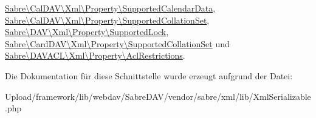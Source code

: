 \mbox{\hyperlink{class_sabre_1_1_cal_d_a_v_1_1_xml_1_1_property_1_1_supported_calendar_data_a4458e6241019a0b31e1c81b76cf5d740}{Sabre\textbackslash{}\+Cal\+D\+A\+V\textbackslash{}\+Xml\textbackslash{}\+Property\textbackslash{}\+Supported\+Calendar\+Data}}, \mbox{\hyperlink{class_sabre_1_1_cal_d_a_v_1_1_xml_1_1_property_1_1_supported_collation_set_ab5e9f7048ec0723afe382543bdd9282e}{Sabre\textbackslash{}\+Cal\+D\+A\+V\textbackslash{}\+Xml\textbackslash{}\+Property\textbackslash{}\+Supported\+Collation\+Set}}, \mbox{\hyperlink{class_sabre_1_1_d_a_v_1_1_xml_1_1_property_1_1_supported_lock_a0d0f874b272baaee90e2b8dc6da386da}{Sabre\textbackslash{}\+D\+A\+V\textbackslash{}\+Xml\textbackslash{}\+Property\textbackslash{}\+Supported\+Lock}}, \mbox{\hyperlink{class_sabre_1_1_card_d_a_v_1_1_xml_1_1_property_1_1_supported_collation_set_a810a1c8c4de80b8a44cceeb7882c57c1}{Sabre\textbackslash{}\+Card\+D\+A\+V\textbackslash{}\+Xml\textbackslash{}\+Property\textbackslash{}\+Supported\+Collation\+Set}} und \mbox{\hyperlink{class_sabre_1_1_d_a_v_a_c_l_1_1_xml_1_1_property_1_1_acl_restrictions_ab8c6081b610ad90690a1aca367a93ebe}{Sabre\textbackslash{}\+D\+A\+V\+A\+C\+L\textbackslash{}\+Xml\textbackslash{}\+Property\textbackslash{}\+Acl\+Restrictions}}.



Die Dokumentation für diese Schnittstelle wurde erzeugt aufgrund der Datei\+:\begin{DoxyCompactItemize}
\item 
Upload/framework/lib/webdav/\+Sabre\+D\+A\+V/vendor/sabre/xml/lib/Xml\+Serializable.\+php\end{DoxyCompactItemize}
